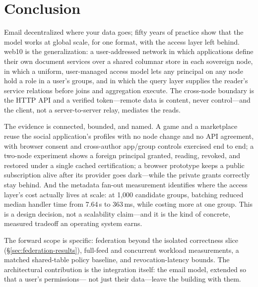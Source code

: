 \documentclass[sigconf, nonacm]{acmart}
\begin{document}
\section{Conclusion}
\label{sec:concl}

Email decentralized where your data goes; fifty years of practice show that
the model works at global scale, for one format, with the access layer left
behind. web10 is the generalization: a user-addressed network in which
applications define their own document services over a shared columnar store
in each sovereign node, in which a uniform, user-managed access model lets
any principal on any node hold a role in a user's groups, and in which the
query layer supplies the reader's service relations before joins and
aggregation execute. The cross-node boundary is the HTTP API and a verified
token---remote data is content, never control---and the client, not a
server-to-server relay, mediates the reads.

The evidence is connected, bounded, and named. A game and a marketplace
reuse the social application's profiles with no node change and no API
agreement, with browser consent and cross-author app/group controls
exercised end to end; a two-node experiment shows a foreign principal
granted, reading, revoked, and restored under a single cached
certification; a browser prototype keeps a public subscription alive after
its provider goes dark---while the private grants correctly stay behind.
And the metadata fan-out measurement identifies where the access layer's
cost actually lives at scale: at 1,000 candidate groups, batching reduced
median handler time from 7.64\,s to 363\,ms, while costing more at one
group. This is a design decision, not a scalability claim---and it is the
kind of concrete, measured tradeoff an operating system earns.

The forward scope is specific: federation beyond the isolated correctness
slice (\S\ref{sec:federation-results}), full-feed and concurrent workload
measurements, a matched shared-table policy baseline, and
revocation-latency bounds. The architectural contribution is the
integration itself: the email model, extended so that a user's permissions---
not just their data---leave the building with them.



\end{document}
